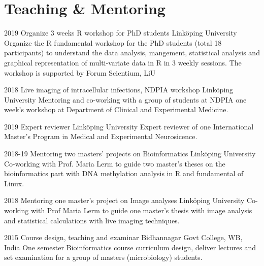 \documentclass[]{friggeri-cv}
\begin{document}
\section{Teaching \& Mentoring}
\begin{entrylist}
\entry
	{2019}
	{Organize 3 weeks R workshop for PhD students}
	{Linköping University}
	{Organize the R fundamental workshop for the PhD students (total 18 participants) to understand the data analysis, mangement, statistical analysis and graphical representation of multi-variate data in R in 3 weekly sessions. The workshop is supported by Forum Scientium, LiU}
	
\entry
	{2018}
	{Live imaging of intracellular infections, NDPIA workshop}
	{Linköping University}
	{Mentoring and co-working with a group of students at NDPIA one week's workshop at Department of Clinical and Experimental Medicine.}
	
\entry
	{2019}
	{Expert reviewer}
	{Linköping University}
	{Expert reviewer of one International Master's Program in Medical and Experimental Neurosicence.}
	
\entry
	{2018-19}
	{Mentoring two masters' projects on Bioinformatics}
	{Linköping University}
	{Co-working with Prof. Maria Lerm to guide two master's theses on the bioinformatics part with DNA methylation analysis in R and fundamental of Linux.}
	
\entry
	{2018}
	{Mentoring one master's project on Image analyses}
	{Linköping University}
	{Co-working with Prof Maria Lerm to guide one master's thesis with image analysis and statistical calculations with live imaging techniques.}
	
\entry
	{2015}
	{Course design, teaching and examinar}
	{Bidhannagar Govt College, WB, India}
	{One semester Bioinformatics course curriculum design, deliver lectures and set examination for a group of masters (microbiology) students.}
\end{entrylist}
\end{document}
